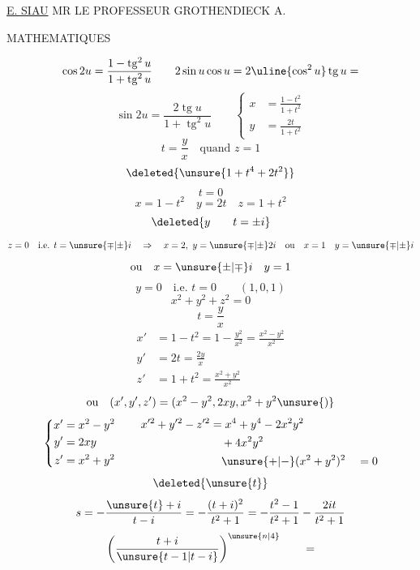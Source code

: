 
\uline{E. SIAU}
MR LE PROFESSEUR GROTHENDIECK A.

MATHEMATIQUES

\[
\cos 2u=\frac{1-\operatorname{tg}^2u}{1+\operatorname{tg}^2u}
\qquad
2\sin u\cos u=2\uline{\cos^2u}\operatorname{tg}u=
\]
\[
\sin 2u=\frac{2\operatorname{tg}u}{1+\operatorname{tg}^2u}
\qquad
\left\{\begin{aligned}
x&=\frac{1-t^2}{1+t^2}\\
y&=\frac{2t}{1+t^2}
\end{aligned}\right.
\]
\[t=\frac yx\quad\text{quand }z=1\]
\[\deleted{\unsure{1+t^4+2t^2}}\]
\[t=0\]
\[x=1-t^2\quad y=2t\quad z=1+t^2\]
\[\deleted{y\qquad t=\pm i}\]
\[
z=0\quad\text{i.e. }t=\unsure{\mp|\pm}i\quad\Rightarrow\quad x=2,\ y=\unsure{\mp|\pm}2i
\quad\text{ou}\quad x=1\quad y=\unsure{\mp|\pm}i
\]
\[\text{ou}\quad x=\unsure{\pm|\mp}i\quad y=1\]
\[y=0\quad\text{i.e. }t=0\qquad(1,0,1)\]
\[
x^2+y^2+z^2=0
\]
\[t=\frac yx\]
\[
\begin{aligned}
x'&=1-t^2=1-\frac{y^2}{x^2}=\frac{x^2-y^2}{x^2}\\
y'&=2t=\frac{2y}{x}\\
z'&=1+t^2=\frac{x^2+y^2}{x^2}
\end{aligned}
\]
\[\text{ou}\quad (x',y',z')=(x^2-y^2,2xy,x^2+y^2\unsure{)}\]
\[
\left\{\begin{aligned}
x'&=x^2-y^2\\
y'&=2xy\\
z'&=x^2+y^2
\end{aligned}\right.
\qquad
\begin{aligned}
x'^2+y'^2-z'^2&=x^4+y^4-2x^2y^2\\
&\quad+4x^2y^2\\
&\quad\unsure{+|-}(x^2+y^2)^2\quad=0
\end{aligned}
\]
\[\deleted{\unsure{t}}\]
\[
s=-\frac{\unsure{t}+i}{t-i}=-\frac{(t+i)^2}{t^2+1}=-\frac{t^2-1}{t^2+1}-\frac{2it}{t^2+1}
\]
\[
\left(\frac{t+i}{\unsure{t-1|t-i}}\right)^{\unsure{n|4}}\qquad=
\]

